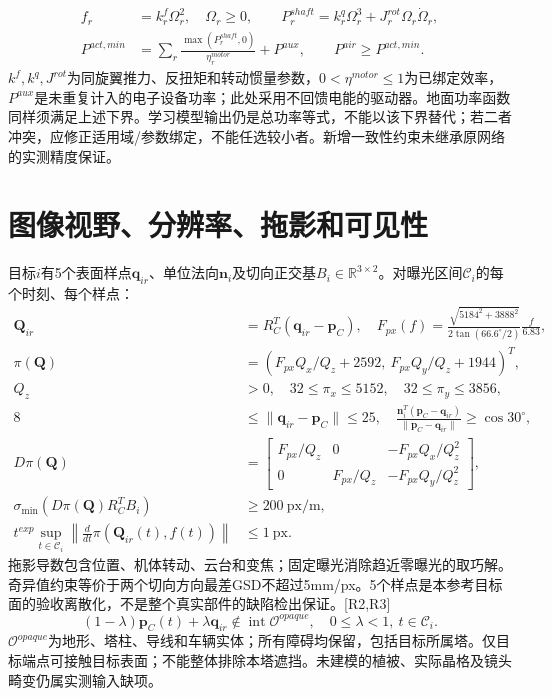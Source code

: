 \begin{align}
 f_r&=k_r^f\Omega_r^2,\quad \Omega_r\ge0,\qquad
 P^{shaft}_r=k_r^q\Omega_r^3+J_r^{rot}\Omega_r\dot\Omega_r,\\
 P^{act,min}&=\sum_r\frac{\max(P^{shaft}_r,0)}{\eta_r^{motor}}+P^{aux},\qquad
 P^{air}\ge P^{act,min}.
 \label{eng:eq:actuatorpower}
\end{align}
\noindent $k^f,k^q,J^{rot}$为同旋翼推力、反扭矩和转动惯量参数，$0<\eta^{motor}\le1$为已绑定效率，$P^{aux}$是未重复计入的电子设备功率；此处采用不回馈电能的驱动器。地面功率函数同样须满足上述下界。学习模型输出仍是总功率等式，不能以该下界替代；若二者冲突，应修正适用域/参数绑定，不能任选较小者。新增一致性约束未继承原网络的实测精度保证。
\clearpage

\section{图像视野、分辨率、拖影和可见性}
\noindent 目标$i$有5个表面样点$\mathbf q_{ir}$、单位法向$\mathbf n_i$及切向正交基$B_i\in\mathbb R^{3\times2}$。对曝光区间$\mathcal C_i$的每个时刻、每个样点：
\begin{align}
 \mathbf Q_{ir}&=R_C^T(\mathbf q_{ir}-\mathbf p_C),\quad
 F_{px}(f)=\frac{\sqrt{5184^2+3888^2}}{2\tan(66.6^\circ/2)}\frac{f}{6.83},\\
 \pi(\mathbf Q)&=(F_{px}Q_x/Q_z+2592,\ F_{px}Q_y/Q_z+1944)^T,\\
 Q_z&>0,\quad 32\le\pi_x\le5152,\quad32\le\pi_y\le3856,\label{eng:eq:fov}\\
 8&\le\|\mathbf q_{ir}-\mathbf p_C\|\le25,\quad
 \frac{\mathbf n_i^T(\mathbf p_C-\mathbf q_{ir})}{\|\mathbf p_C-\mathbf q_{ir}\|}\ge\cos30^\circ,
 \label{eng:eq:viewangle}\\
 D\pi(\mathbf Q)&=\begin{bmatrix}F_{px}/Q_z&0&-F_{px}Q_x/Q_z^2\\
 0&F_{px}/Q_z&-F_{px}Q_y/Q_z^2\end{bmatrix},\\
 \sigma_{\min}\!\left(D\pi(\mathbf Q)R_C^TB_i\right)&\ge200\ \mathrm{px/m},
 \label{eng:eq:gsd}\\
 t^{exp}\sup_{t\in\mathcal C_i}\left\|\frac{d}{dt}\pi(\mathbf Q_{ir}(t),f(t))\right\|&\le1\ \mathrm{px}.
 \label{eng:eq:blur}
\end{align}
\noindent 拖影导数包含位置、机体转动、云台和变焦；固定曝光消除趋近零曝光的取巧解。奇异值约束等价于两个切向方向最差GSD不超过5mm/px。5个样点是本参考目标面的验收离散化，不是整个真实部件的缺陷检出保证。[R2,R3]
\begin{equation}
 (1-\lambda)\mathbf p_C(t)+\lambda\mathbf q_{ir}\notin\operatorname{int}\mathcal O^{opaque},
 \quad 0\le\lambda<1,\ t\in\mathcal C_i.
 \label{eng:eq:visibility}
\end{equation}
\noindent $\mathcal O^{opaque}$为地形、塔柱、导线和车辆实体；所有障碍均保留，包括目标所属塔。仅目标端点可接触目标表面；不能整体排除本塔遮挡。未建模的植被、实际晶格及镜头畸变仍属实测输入缺项。
\clearpage

